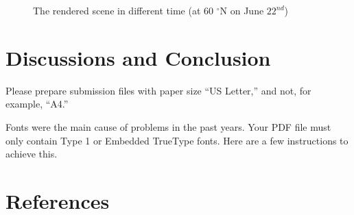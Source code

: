 \documentclass{article}
\begin{document}
\begin{figure}[h]
  \hfill
  \hfill

  \caption{The rendered scene in different time (at 60 $^{\circ}$N on June \(22^{nd}\))}
  \label{fig:AllL60N}
\end{figure}

\section{Discussions and Conclusion}
Please prepare submission files with paper size ``US Letter,'' and not, for
example, ``A4.''


Fonts were the main cause of problems in the past years. Your PDF file must only
contain Type 1 or Embedded TrueType fonts. Here are a few instructions to
achieve this.


\section*{References}
\end{document}
